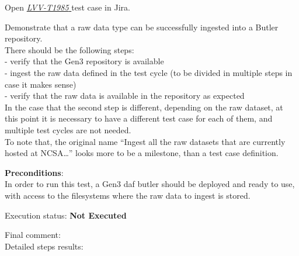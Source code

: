 \documentclass[DM,lsstdraft,STR,toc]{lsstdoc}
\begin{document}
Open  \href{https://jira.lsstcorp.org/secure/Tests.jspa#/testCase/LVV-T1985}{\textit{ LVV-T1985 } }
test case in Jira.

Demonstrate that a raw data type can be successfully ingested into a
Butler repository.\\[2\baselineskip]There should be the following
steps:\\
- verify that the Gen3 repository is available\\
- ingest the raw data defined in the test cycle (to be divided in
multiple steps in case it makes sense)\\
- verify that the raw data is available in the repository as expected\\
In the case that the second step is different, depending on the raw
dataset, at this point it is necessary to have a different test case for
each of them, and multiple test cycles are not
needed.\\[2\baselineskip]To note that, the original name ``Ingest all
the raw datasets that are currently hosted at NCSA\ldots{}'' looks more
to be a milestone, than a test case definition.

\textbf{ Preconditions}:\\
In order to run this test, a Gen3 daf butler should be deployed and
ready to use, with access to the filesystems where the raw data to
ingest is stored.

Execution status: {\bf Not Executed }

Final comment:\\


Detailed steps results:
\end{document}
